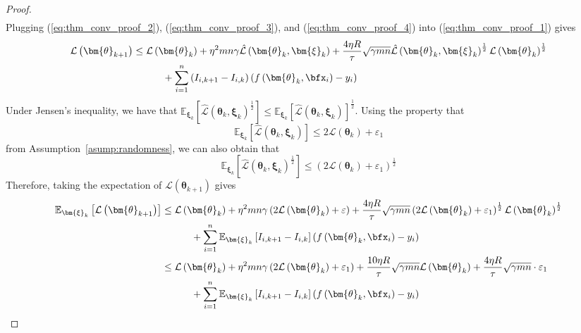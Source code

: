 \documentclass[10pt]{article} %
\theoremstyle{definition}
\theoremstyle{plain}
\newcommand{\paren}[1]{\left(#1\right)}
\providecommand{\E}{\mathbb{E}}
\def\calL{{\mathcal{L}}}
\begin{document}
\begin{proof}
\begin{equation}
\begin{aligned}
        \end{aligned}
    \end{equation}
    Plugging (\ref{eq:thm_conv_proof_2}), (\ref{eq:thm_conv_proof_3}), and (\ref{eq:thm_conv_proof_4}) into (\ref{eq:thm_conv_proof_1}) gives
    \begin{align*}
        \calL\paren{\bm{\theta}_{k+1}} & \leq \calL\paren{\bm{\theta}_k} + \eta^2mn\gamma\hat{\calL}\paren{\bm{\theta}_k,\bm{\xi}_k} + \frac{4\eta R}{\tau}\sqrt{\gamma mn}\hat{\calL}\paren{\bm{\theta}_k,\bm{\xi}_k}^{\frac{1}{2}}\calL\paren{\bm{\theta}_k}^{\frac{1}{2}}\\
        & \quad\quad\quad +\sum_{i=1}^n\paren{I_{i,k+1} - I_{i,k}}\paren{f\paren{\bm{\theta}_k,\bfx_i} - y_i}
    \end{align*}
    Under Jensen's inequality, we have that $\E_{\bm{\xi}_k}\left[\hat{\calL}\paren{\bm{\theta}_k,\bm{\xi}_k}^{\frac{1}{2}}\right] \leq \E_{\bm{\xi}_k}\left[\hat{\calL}\paren{\bm{\theta}_k,\bm{\xi}_k}\right]^{\frac{1}{2}}$. Using the property that
    \[
        \E_{\bm{\xi}_k}\left[\hat{\calL}\paren{\bm{\theta}_k,\bm{\xi}_k}\right] \leq 2\calL\paren{\bm{\theta}_k} + \varepsilon_1
    \]
    from Assumption~\ref{asump:randomness}, we can also obtain that
    \[
        \E_{\bm{\xi}_k}\left[\hat{\calL}\paren{\bm{\theta}_k,\bm{\xi}_k}^{\frac{1}{2}}\right] \leq \paren{2\calL\paren{\bm{\theta}_k} + \varepsilon_1}^{\frac{1}{2}}
    \]
    Therefore, taking the expectation of $\calL\paren{\bm{\theta}_{k+1}}$ gives
    \begin{equation}
        \label{eq:thm_conv_proof_5}
        \begin{aligned}
            \E_{\bm{\xi}_k}\left[\calL\paren{\bm{\theta}_{k+1}}\right] & \leq \calL\paren{\bm{\theta}_k} + \eta^2mn\gamma\paren{2\calL\paren{\bm{\theta}_k} + \varepsilon} + \frac{4\eta R}{\tau}\sqrt{\gamma mn}\paren{2\calL\paren{\bm{\theta}_k} + \varepsilon_1}^{\frac{1}{2}}\calL\paren{\bm{\theta}_k}^{\frac{1}{2}}\\
            &\quad\quad\quad + \sum_{i=1}^n\E_{\bm{\xi}_k}\left[I_{i,k+1}-I_{i,k}\right]\paren{f\paren{\bm{\theta}_k,\bfx_i} - y_i}\\
            & \leq \calL\paren{\bm{\theta}_k} + \eta^2mn\gamma\paren{2\calL\paren{\bm{\theta}_k} + \varepsilon_1} + \frac{10\eta R}{\tau}\sqrt{\gamma mn}\calL\paren{\bm{\theta}_k} + \frac{4\eta R}{\tau}\sqrt{\gamma mn}\cdot \varepsilon_1\\
            &\quad\quad\quad + \sum_{i=1}^n\E_{\bm{\xi}_k}\left[I_{i,k+1}-I_{i,k}\right]\paren{f\paren{\bm{\theta}_k,\bfx_i} - y_i}\\

\end{aligned}
\end{equation}
\end{proof}
\end{document}

